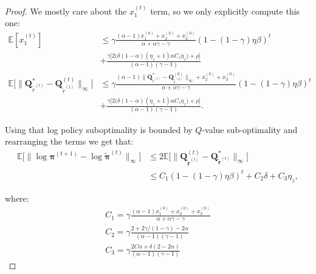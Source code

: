 \begin{proof}
    We mostly care about the $x_1^{(t)}$ term, so we only explicitly compute this one:
    \begin{align*}
        \mathbb{E} [x_1^{(t)}] &\leq\gamma \frac{(\alpha - 1)x_1^{(0)}+x_2^{(0)}+x_3^{(0)} }{\alpha + \alpha\gamma - \gamma}
        (1 - (1-\gamma)\eta\beta)^t  \\ &
        + \frac{\gamma\Big[ 2\big( \delta (1-\alpha)(\eta_z+1) \alpha C_z \eta_z \big) + \rho \Big] }{(\alpha-1)(\gamma-1)} \\
        \mathbb{E} \Big[
        \| \bm{Q}^*_{\tilde{r}^{(t)}}
        -\bm{Q}^{(t)}_{\tilde{r}^{(t)}} \|_\infty \Big]
        &\leq\gamma \frac{(\alpha - 1)
        \| \bm{Q}^*_{\tilde{r}^{(t)}}
        -\bm{Q}^{(0)}_{\tilde{r}^{(0)}} \|_\infty 
        +x_2^{(0)}+x_3^{(0)} }{\alpha + \alpha\gamma - \gamma}
        (1 - (1-\gamma)\eta\beta)^t  \\ &
        + \frac{\gamma\Big[ 2\big( \delta (1-\alpha)(\eta_z+1) \alpha C_z \eta_z \big) + \rho \Big] }{(\alpha-1)(\gamma-1)}.
    \end{align*}

    Using that log policy suboptimality is bounded by $Q$-value sub-optimality and rearranging the terms we get that:
    \begin{equation}
        \begin{aligned}
            \mathbb{E} \Big[ 
                \| \log \bm{\pi}^{(t+1)} - \log \tilde{\bm{\pi}}^{(t)} \|_\infty 
            \Big]
            &\leq
            2 
            \mathbb{E} \Big[ 
                \|\bm{Q}^{(t)}_{\tilde{\bm{r}}^{(t)}}- \bm{Q}^*_{\tilde{\bm{r}}^{(t)}} \|_\infty 
            \Big] \\
            &\leq
            C_1 (1-(1-\gamma)\eta \beta)^t + C_2 \delta + C_3 \eta_z,
        \end{aligned}
    \end{equation}

    where:
    \begin{align*}
        C_1 = 
        \gamma \frac{(\alpha - 1)x_1^{(0)}+x_2^{(0)}+x_3^{(0)} }{\alpha + \alpha\gamma - \gamma}\\
        C_2 = \gamma\frac{2+2\gamma/(1-\gamma) - 2 \alpha }{(\alpha-1)(\gamma-1)}\\
        C_3 = \gamma\frac{2C\alpha+\delta (2-2\alpha)}{(\alpha-1)(\gamma-1)}
    \end{align*}



\end{proof}